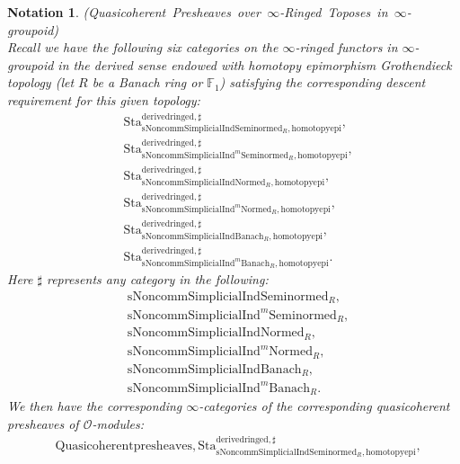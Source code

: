 \documentclass[12pt]{book}
\newtheorem{notation}{Notation}
\begin{document}
\begin{notation}\mbox{\rm{(Quasicoherent Presheaves over $\infty$-Ringed Toposes in $\infty$-groupoid)}}\\
Recall we have the following six categories on the $\infty$-ringed functors in $\infty$-groupoid in the derived sense endowed with homotopy epimorphism Grothendieck topology (let $R$ be a Banach ring or $\mathbb{F}_1$) satisfying the corresponding descent requirement for this given topology:
\begin{align}
&\mathrm{Sta}^\mathrm{derivedringed,\sharp}_{\mathrm{sNoncomm}\mathrm{Simplicial}\mathrm{Ind}\mathrm{Seminormed}_R,\mathrm{homotopyepi}},\\
&\mathrm{Sta}^\mathrm{derivedringed,\sharp}_{\mathrm{sNoncomm}\mathrm{Simplicial}\mathrm{Ind}^m\mathrm{Seminormed}_R,\mathrm{homotopyepi}},\\
&\mathrm{Sta}^\mathrm{derivedringed,\sharp}_{\mathrm{sNoncomm}\mathrm{Simplicial}\mathrm{Ind}\mathrm{Normed}_R,\mathrm{homotopyepi}},\\
&\mathrm{Sta}^\mathrm{derivedringed,\sharp}_{\mathrm{sNoncomm}\mathrm{Simplicial}\mathrm{Ind}^m\mathrm{Normed}_R,\mathrm{homotopyepi}},\\
&\mathrm{Sta}^\mathrm{derivedringed,\sharp}_{\mathrm{sNoncomm}\mathrm{Simplicial}\mathrm{Ind}\mathrm{Banach}_R,\mathrm{homotopyepi}},\\
&\mathrm{Sta}^\mathrm{derivedringed,\sharp}_{\mathrm{sNoncomm}\mathrm{Simplicial}\mathrm{Ind}^m\mathrm{Banach}_R,\mathrm{homotopyepi}}.	
\end{align}
Here $\sharp$ represents any category in the following:
\begin{align}
&\mathrm{sNoncomm}\mathrm{Simplicial}\mathrm{Ind}\mathrm{Seminormed}_R,\\
&\mathrm{sNoncomm}\mathrm{Simplicial}\mathrm{Ind}^m\mathrm{Seminormed}_R,\\
&\mathrm{sNoncomm}\mathrm{Simplicial}\mathrm{Ind}\mathrm{Normed}_R,\\
&\mathrm{sNoncomm}\mathrm{Simplicial}\mathrm{Ind}^m\mathrm{Normed}_R,\\
&\mathrm{sNoncomm}\mathrm{Simplicial}\mathrm{Ind}\mathrm{Banach}_R,\\
&\mathrm{sNoncomm}\mathrm{Simplicial}\mathrm{Ind}^m\mathrm{Banach}_R.	
\end{align}	
We then have the corresponding $\infty$-categories of the corresponding quasicoherent presheaves of $\mathcal{O}$-modules:
\begin{align}
&\mathrm{Quasicoherentpresheaves,Sta}^\mathrm{derivedringed,\sharp}_{\mathrm{sNoncomm}\mathrm{Simplicial}\mathrm{Ind}\mathrm{Seminormed}_R,\mathrm{homotopyepi}},\\

\end{align}
\end{notation}
\end{document}
